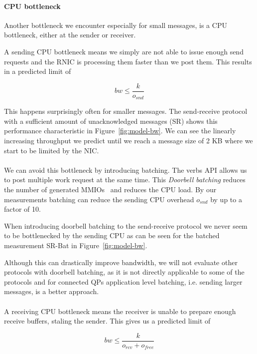 \paragraph{CPU bottleneck} Another bottleneck we encounter especially for small messages, is a CPU bottleneck, either at the 
sender or receiver.

A sending CPU bottleneck means we simply are not able to issue enough send requests and the RNIC is processing them faster
than we post them. This results in a predicted limit of

$$
bw \leq \frac{k}{o_{snd}}
$$



This happens surprisingly often for smaller messages. The send-receive protocol with a sufficient amount
of unacknowledged messages (SR) shows this performance characteristic in Figure~\ref{fig:model-bw}. We can see the linearly
increasing throughput we predict until we reach a message size of 2 KB where we start to be limited by the NIC.

\paragraph{} We can avoid this bottleneck by introducing batching. The verbs API allows us to post multiple work request at 
the same time. This \emph{Doorbell batching} reduces the number of generated MMIOs~\cite{anuj-guide} and reduces the CPU load.
By our measurements batching can reduce the sending CPU overhead $o_{snd}$ by up to a factor of 10. 

When introducing doorbell batching to the send-receive protocol we never seem to be bottlenecked by the sending CPU as 
can be seen for the batched measurement SR-Bat in Figure~\ref{fig:model-bw}.

Although this can drastically improve bandwidth, we will not evaluate other protocols with doorbell batching, as it is
not directly applicable to some of the protocols and for connected QPs application level batching, i.e. sending larger 
messages, is a better approach.

\paragraph{} A receiving CPU bottleneck means the receiver is unable to prepare enough receive buffers, staling the sender. 
This gives us a predicted limit of

$$
bw \leq \frac{k}{o_{rcv} + o_{free}}
$$


